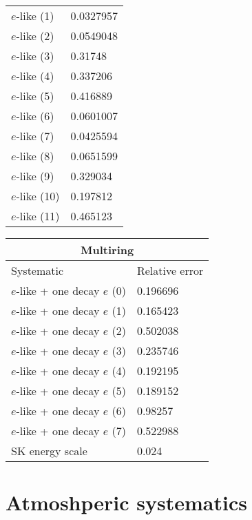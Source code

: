 \begin{center}
\begin{tabular}{ll}
		$e$-like (1)	& 0.0327957	\\
		$e$-like (2)	& 0.0549048	\\
		$e$-like (3)	& 0.31748	\\
		$e$-like (4)	& 0.337206	\\
		$e$-like (5)	& 0.416889	\\
		$e$-like (6)	& 0.0601007	\\
		$e$-like (7)	& 0.0425594	\\
		$e$-like (8)	& 0.0651599	\\
		$e$-like (9)	& 0.329034	\\
		$e$-like (10)	& 0.197812	\\
		$e$-like (11)	& 0.465123	\\
		\bottomrule
	\end{tabular}
	\hfill
	\begin{tabular}{ll}
		\toprule
		\multicolumn{2}{c}{Multiring} \\
		\midrule
		Systematic &	Relative error	 \\
		\midrule
		$e$-like + one decay $e$ (0)	& 0.196696	\\
		$e$-like + one decay $e$ (1)	& 0.165423	\\
		$e$-like + one decay $e$ (2)	& 0.502038	\\
		$e$-like + one decay $e$ (3)	& 0.235746	\\
		$e$-like + one decay $e$ (4)	& 0.192195	\\
		$e$-like + one decay $e$ (5)	& 0.189152	\\
		$e$-like + one decay $e$ (6)	& 0.98257	\\
		$e$-like + one decay $e$ (7)	& 0.522988	\\
		\midrule
		SK energy scale			& 0.024	\\
		\bottomrule
	\end{tabular}
\end{center}


\section{Atmoshperic systematics}

